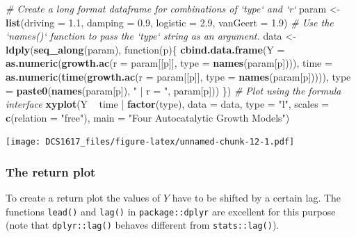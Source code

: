 \documentclass[]{book}
\newenvironment{Shaded}{\begin{snugshade}}{\end{snugshade}}
\newcommand{\KeywordTok}[1]{\textcolor[rgb]{0.13,0.29,0.53}{\textbf{{#1}}}}
\newcommand{\DataTypeTok}[1]{\textcolor[rgb]{0.13,0.29,0.53}{{#1}}}
\newcommand{\FloatTok}[1]{\textcolor[rgb]{0.00,0.00,0.81}{{#1}}}
\newcommand{\StringTok}[1]{\textcolor[rgb]{0.31,0.60,0.02}{{#1}}}
\newcommand{\CommentTok}[1]{\textcolor[rgb]{0.56,0.35,0.01}{\textit{{#1}}}}
\newcommand{\NormalTok}[1]{{#1}}
\begin{document}
\begin{Shaded}
\begin{Highlighting}[]
\CommentTok{# Create a long format dataframe for combinations of `type` and `r`}
\NormalTok{param <-}\StringTok{ }\KeywordTok{list}\NormalTok{(}\DataTypeTok{driving  =} \FloatTok{1.1}\NormalTok{,}
              \DataTypeTok{damping  =} \FloatTok{0.9}\NormalTok{,}
              \DataTypeTok{logistic =} \FloatTok{2.9}\NormalTok{,}
              \DataTypeTok{vanGeert =} \FloatTok{1.9}\NormalTok{)}
\CommentTok{# Use the `names()` function to pass the `type` string as an argument.}
\NormalTok{data <-}\StringTok{ }\KeywordTok{ldply}\NormalTok{(}\KeywordTok{seq_along}\NormalTok{(param), function(p)\{}
    \KeywordTok{cbind.data.frame}\NormalTok{(}\DataTypeTok{Y    =} \KeywordTok{as.numeric}\NormalTok{(}\KeywordTok{growth.ac}\NormalTok{(}\DataTypeTok{r =} \NormalTok{param[[p]], }\DataTypeTok{type =} \KeywordTok{names}\NormalTok{(param[p]))),}
                     \DataTypeTok{time =} \KeywordTok{as.numeric}\NormalTok{(}\KeywordTok{time}\NormalTok{(}\KeywordTok{growth.ac}\NormalTok{(}\DataTypeTok{r =} \NormalTok{param[[p]], }\DataTypeTok{type =} \KeywordTok{names}\NormalTok{(param[p])))),}
                     \DataTypeTok{type =} \KeywordTok{paste0}\NormalTok{(}\KeywordTok{names}\NormalTok{(param[p]), }\StringTok{" | r = "}\NormalTok{, param[p]))}
    \NormalTok{\})}
\CommentTok{# Plot using the formula interface}
\KeywordTok{xyplot}\NormalTok{(Y ~}\StringTok{ }\NormalTok{time |}\StringTok{ }\KeywordTok{factor}\NormalTok{(type), }\DataTypeTok{data =} \NormalTok{data, }\DataTypeTok{type =} \StringTok{"l"}\NormalTok{, }\DataTypeTok{scales =} \KeywordTok{c}\NormalTok{(}\DataTypeTok{relation =} \StringTok{"free"}\NormalTok{),}
       \DataTypeTok{main =} \StringTok{"Four Autocatalytic Growth Models"}\NormalTok{)}
\end{Highlighting}
\end{Shaded}

\texttt{[image: DCS1617\_files/figure-latex/unnamed-chunk-12-1.pdf]}

\subsubsection*{The return plot}\label{the-return-plot-1}

To create a return plot the values of \(Y\) have to be shifted by a
certain lag. The functions \texttt{lead()} and \texttt{lag()} in
\texttt{package::dplyr} are excellent for this purpose (note that
\texttt{dplyr::lag()} behaves different from \texttt{stats::lag()}).
\end{document}
